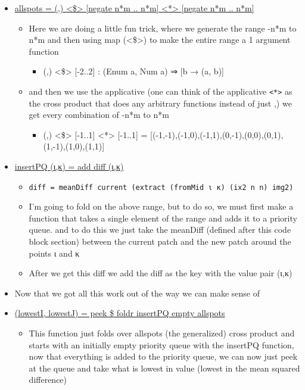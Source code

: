 \documentclass{article}
\begin{document}
\begin{enumerate}
\begin{itemize}
\begin{itemize}
\begin{itemize}
\begin{itemize}
\end{itemize}
\item \uline{allspots = (,) <\$> [negate n*m .. n*m] <*> [negate n*m .. n*m]}
\begin{itemize}
\item Here we are doing a little fun trick, where we generate the
range -n*m to n*m and then using map (<\$>) to make the entire
range a 1 argument function
\begin{itemize}
\item (,) <\$> [-2..2] : (Enum a, Num a) ⇒ [b → (a, b)]
\end{itemize}
\item and then we use the applicative (one can think of the
applicative \texttt{<*>} as the cross product that does any arbitrary
functions instead of just ,) we get every combination of -n*m
to n*m
\begin{itemize}
\item (,) <\$> [-1..1] <*> [-1..1] = [(-1,-1),(-1,0),(-1,1),(0,-1),(0,0),(0,1),(1,-1),(1,0),(1,1)]
\end{itemize}
\end{itemize}
\item \uline{insertPQ (ι,κ) = add diff (ι,κ)}
\begin{itemize}
\item \texttt{diff = meanDiff current (extract (fromMid ι κ) (ix2 n n) img2)}
\item I'm going to fold on the above range, but to do so, we must
first make a function that takes a single element of the range
and adds it to a priority queue. and to do this we just take the
meanDiff (defined after this code block section) between the
current patch and the new patch around the points ι and κ
\item After we get this diff we add the diff as the key with the
value pair (ι,κ)
\end{itemize}
\item Now that we got all this work out of the way we can make sense
of
\item \uline{(lowestI, lowestJ) = peek \$ foldr insertPQ empty allspots}
\begin{itemize}
\item This function just folds over allspots (the generalized) cross
product and starts with an initially empty priority queue with
the insertPQ function, now that everything is added to the
priority queue, we can now just peek at the queue and take what
is lowest in value (lowest in the mean squared difference)
\end{itemize}

\end{itemize}
\end{itemize}
\end{itemize}
\end{enumerate}
\end{document}
